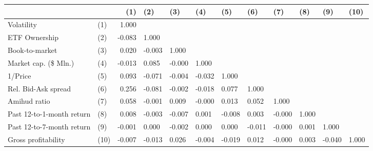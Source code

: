 \begin{tabular}{llrlllllllll}
\toprule
                    &      &    (1) &    (2) &    (3) &    (4) &    (5) &    (6) &    (7) &   (8) &    (9) &  (10) \\
\midrule
Volatility & (1) &  1.000 &        &        &        &        &        &        &       &        &       \\
ETF Ownership & (2) & -0.083 &  1.000 &        &        &        &        &        &       &        &       \\
Book-to-market & (3) &  0.020 & -0.003 &  1.000 &        &        &        &        &       &        &       \\
Market cap. (\$ Mln.) & (4) & -0.013 &  0.085 & -0.000 &  1.000 &        &        &        &       &        &       \\
1/Price & (5) &  0.093 & -0.071 & -0.004 & -0.032 &  1.000 &        &        &       &        &       \\
Rel. Bid-Ask spread & (6) &  0.256 & -0.081 & -0.002 & -0.018 &  0.077 &  1.000 &        &       &        &       \\
Amihud ratio & (7) &  0.058 & -0.001 &  0.009 & -0.000 &  0.013 &  0.052 &  1.000 &       &        &       \\
Past 12-to-1-month return & (8) &  0.008 & -0.003 & -0.007 &  0.001 & -0.008 &  0.003 & -0.000 & 1.000 &        &       \\
Past 12-to-7-month return & (9) & -0.001 &  0.000 & -0.002 &  0.000 &  0.000 & -0.011 & -0.000 & 0.001 &  1.000 &       \\
Gross profitability & (10) & -0.007 & -0.013 &  0.026 & -0.004 & -0.019 &  0.012 & -0.000 & 0.003 & -0.040 & 1.000 \\
\bottomrule
\end{tabular}
